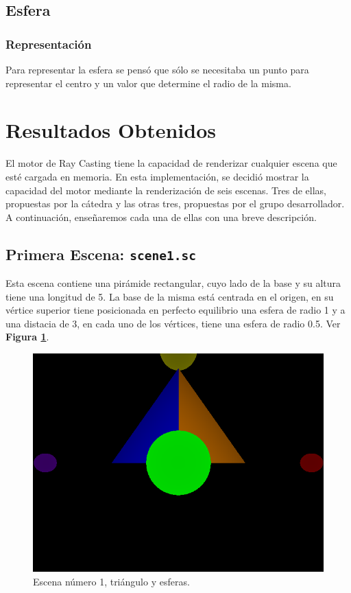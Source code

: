 \documentclass[a4paper,10pt]{article}
\begin{document}
\subsection{Esfera}

\subsubsection{Representaci\'on}

Para representar la esfera se pens\'o que s\'olo se necesitaba un punto para representar el centro y un valor que determine el radio de la misma.



\section{Resultados Obtenidos}
\label{escenas}
El motor de Ray Casting tiene la capacidad de renderizar cualquier escena que est\'e cargada en memoria.  En esta implementaci\'on, se decidi\'o mostrar la capacidad del motor mediante la renderizaci\'on de seis escenas.  Tres de ellas, propuestas por la c\'atedra y las otras tres, propuestas por el grupo desarrollador.  A continuaci\'on, ense\~naremos cada una de ellas con una breve descripci\'on.

\subsection{Primera Escena: \texttt{scene1.sc}}
Esta escena contiene una pir\'amide rectangular, cuyo lado de la base y su altura tiene una longitud de 5.  La base de la misma est\'a centrada en el origen, en su v\'ertice superior tiene posicionada en perfecto equilibrio una esfera de radio 1 y a una distacia de 3, en cada uno de los v\'ertices, tiene una esfera de radio 0.5. Ver \textbf{Figura \ref{fig:1}}.

\begin{figure}[h]
 \centering
 \includegraphics[width=320pt,keepaspectratio=true]{../scene1.png}
 \caption{Escena n\'umero 1, tri\'angulo y esferas.}
 \label{fig:1}
\end{figure}
\end{document}
